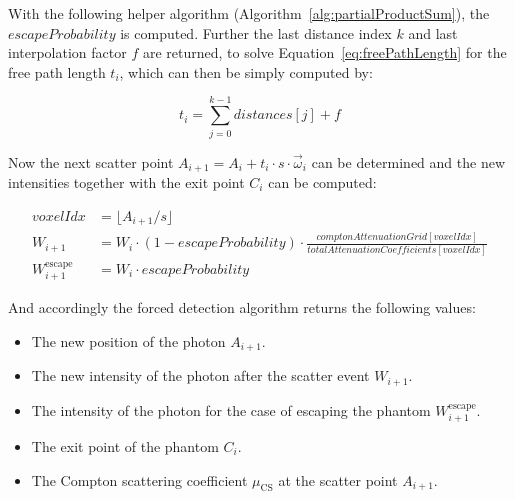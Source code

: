 With the following helper algorithm (Algorithm~\ref{alg:partialProductSum}), the $escapeProbability$ is computed. Further the last distance index $k$ and last interpolation factor $f$ are returned, to solve Equation~\ref{eq:freePathLength} for the free path length $t_i$, which can then be simply computed by:

\begin{equation}
    t_i = \sum_{j=0}^{k-1} distances[j] + f
\end{equation}

Now the next scatter point $A_{i+1}=A_i+t_i\cdot s \cdot\vec{\omega}_i$ can be
determined and the new intensities together with the exit point $C_i$ can be
computed:

\begin{align*}
    voxelIdx &= \lfloor A_{i+1} / s \rfloor \\
    W_{i+1} &= W_i \cdot (1 - escapeProbability) \cdot \frac
    {comptonAttenuationGrid[voxelIdx]}{totalAttenuationCoefficients[voxelIdx]} 
    \\
    W^{\text{escape}}_{i+1} &= W_i \cdot escapeProbability
\end{align*}

And accordingly the forced detection algorithm returns the following values:
\begin{itemize}
    \item The new position of the photon $A_{i+1}$.
    \item The new intensity of the photon after the scatter event $W_{i+1}$.
    \item The intensity of the photon for the case of escaping the phantom $W^{\text{escape}}_{i+1}$.
    \item The exit point of the phantom $C_i$.
    \item The Compton scattering coefficient $\mu_{\text{CS}}$ at the scatter
    point $A_{i+1}$.
\end{itemize}

